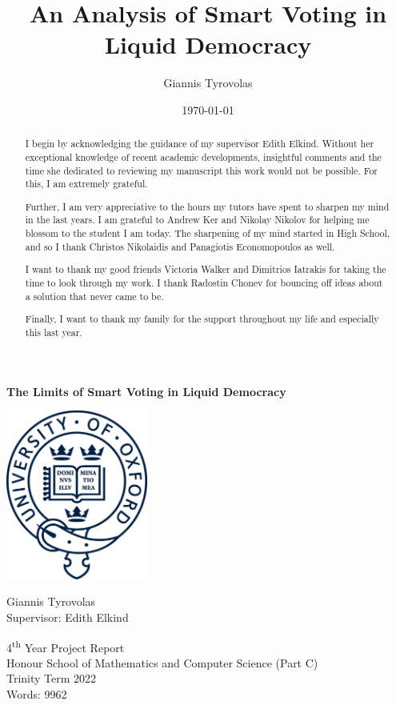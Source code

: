 \documentclass[11pt,a4paper, titlepage]{article}
\title{An Analysis of Smart Voting in Liquid Democracy}
\author{Giannis Tyrovolas}
\date{\today}
\theoremstyle{definition}
\begin{document}
\begin{titlepage}
    \begin{center}
        \huge
        \textbf{The Limits of Smart Voting in Liquid Democracy}

        \vfill
        
        \includegraphics[width=0.35\textwidth]{logo.jpeg}
        
        \vfill
        
        \LARGE
        Giannis Tyrovolas \\
        \Large
        Supervisor: Edith Elkind\\
        
        \vspace*{1.5cm}
        
        4\textsuperscript{th} Year Project Report\\
        \vspace*{2pt}
        Honour School of Mathematics and Computer Science (Part C)\\
        \vspace*{.5cm}
        Trinity Term 2022 \\
        Words: 9962
    \end{center}

\end{titlepage}

\renewcommand{\abstractname}{Acknowledgements}
\begin{abstract}
    I begin by acknowledging the guidance of my supervisor Edith Elkind. Without her exceptional knowledge of recent academic developments, insightful comments and the time she dedicated to reviewing my manuscript this work would not be possible.
For this, I am extremely grateful.

Further, I am very appreciative to the hours my tutors have spent to sharpen my mind in the last years. 
I am grateful to Andrew Ker and Nikolay Nikolov for helping me blossom to the student I am today.
The sharpening of my mind started in High School, and so I thank Christos Nikolaidis and Panagiotis Economopoulos as well.

I want to thank my good friends Victoria Walker and Dimitrios Iatrakis for taking the time to look through my work. I thank Radostin Chonev for bouncing off ideas about a solution that never came to be.

Finally, I want to thank my family for the support throughout my life and especially this last year.

\end{abstract}
\end{document}
